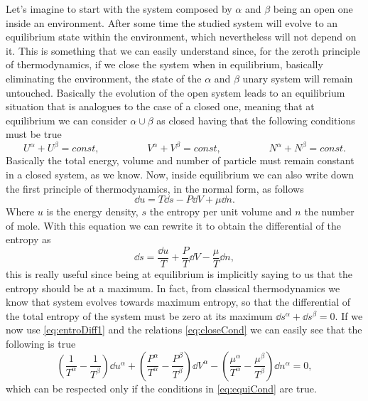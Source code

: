 {
    Let's imagine to start with the system composed by $\alpha$ and $\beta$ being an open one inside an environment. After some time the studied system will evolve to an equilibrium state within the environment, which nevertheless will not depend on it. This is something that we can easily understand since, for the zeroth principle of thermodynamics, if we close the system when in equilibrium, basically eliminating the environment, the state of the $\alpha$ and $\beta$ unary system will remain untouched. Basically the evolution of the open system leads to an equilibrium situation that is analogues to the case of a closed one, meaning that at equilibrium we can consider $\alpha \cup \beta$ as closed having that the following conditions must be true
    \begin{equation}
        \label{eq:closeCond}
        U^\alpha + U^\beta = const, \hspace{2cm} V^\alpha + V^\beta = const, \hspace{2cm} N^\alpha + N^\beta = const.
    \end{equation}
    Basically the total energy, volume and number of particle must remain constant in a closed system, as we know. Now, inside equilibrium we can also write down the first principle of thermodynamics, in the normal form, as follows
    \begin{equation}
        \dd u = T\dd s - P \dd V + \mu\dd n.
    \end{equation} 
    Where $u$ is the energy density, $s$ the entropy per unit volume and $n$ the number of mole. With this equation we can rewrite it to obtain the differential of the entropy as
    \begin{equation}
        \label{eq:entroDiff1}
        \dd s = \frac{\dd u}{T} + \frac{P}{T}\dd V - \frac{\mu}{T} \dd n,
    \end{equation}
    this is really useful since being at equilibrium is implicitly saying to us that the entropy should be at a maximum. In fact, from classical thermodynamics we know that system evolves towards maximum entropy, so that the differential of the total entropy of the system must be zero at its maximum $\dd s^\alpha + \dd s^\beta = 0$. If we now use \eqref{eq:entroDiff1} and the relations \eqref{eq:closeCond} we can easily see that the following is true
    \begin{equation}
        \left( \frac{1}{T^\alpha} - \frac{1}{T^\beta} \right)\dd u^\alpha + \left( \frac{P^\alpha}{T^\alpha} - \frac{P^\beta}{T^\beta} \right) \dd V^\alpha - \left( \frac{\mu^\alpha}{T^\alpha} - \frac{\mu^\beta}{T^\beta} \right) \dd n^\alpha = 0,
    \end{equation}
    which can be respected only if the conditions in \eqref{eq:equiCond} are true.
}

